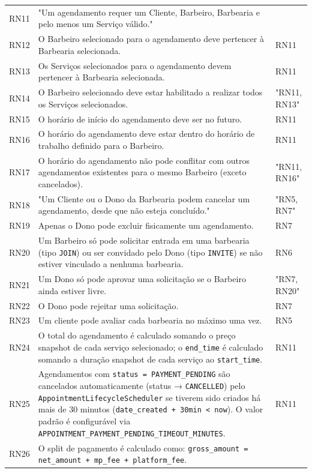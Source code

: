 \documentclass[
    12pt, 
    a4paper, 
    oneside, 
    chapter=TITLE, 
    section=TITLE
]{abntex2}
\begin{document}
\begin{longtable}{p{1.5cm} p{10.5cm} p{2cm}}
    RN11 & "Um agendamento requer um Cliente, Barbeiro, Barbearia e pelo menos um Serviço válido." & \\
    RN12 & O Barbeiro selecionado para o agendamento deve pertencer à Barbearia selecionada. & RN11 \\
    RN13 & Os Serviços selecionados para o agendamento devem pertencer à Barbearia selecionada. & RN11 \\
    RN14 & O Barbeiro selecionado deve estar habilitado a realizar todos os Serviços selecionados. & "RN11, RN13" \\
    RN15 & O horário de início do agendamento deve ser no futuro. & RN11 \\
    RN16 & O horário do agendamento deve estar dentro do horário de trabalho definido para o Barbeiro. & RN11 \\
    RN17 & O horário do agendamento não pode conflitar com outros agendamentos existentes para o mesmo Barbeiro (exceto cancelados). & "RN11, RN16" \\
    RN18 & "Um Cliente ou o Dono da Barbearia podem cancelar um agendamento, desde que não esteja concluído." & "RN5, RN7" \\
    RN19 & Apenas o Dono pode excluir fisicamente um agendamento. & RN7 \\
    RN20 & Um Barbeiro só pode solicitar entrada em uma barbearia (tipo \texttt{JOIN}) ou ser convidado pelo Dono (tipo \texttt{INVITE}) se não estiver vinculado a nenhuma barbearia. & RN6 \\
    RN21 & Um Dono só pode aprovar uma solicitação se o Barbeiro ainda estiver livre. & "RN7, RN20" \\
    RN22 & O Dono pode rejeitar uma solicitação. & RN7 \\
    RN23 & Um cliente pode avaliar cada barbearia no máximo uma vez. & RN5 \\
    RN24 & O total do agendamento é calculado somando o preço snapshot de cada serviço selecionado; o \texttt{end\_time} é calculado somando a duração snapshot de cada serviço ao \texttt{start\_time}. & RN11 \\
    RN25 & Agendamentos com \texttt{status = PAYMENT\_PENDING} são cancelados automaticamente (status → \texttt{CANCELLED}) pelo \texttt{AppointmentLifecycleScheduler} se tiverem sido criados há mais de 30 minutos (\texttt{date\_created + 30min < now}). O valor padrão é configurável via \texttt{APPOINTMENT\_PAYMENT\_PENDING\_TIMEOUT\_MINUTES}. & RN11 \\
    RN26 & O split de pagamento é calculado como: \texttt{gross\_amount = net\_amount + mp\_fee + platform\_fee}. & \\

\end{longtable}
\end{document}
